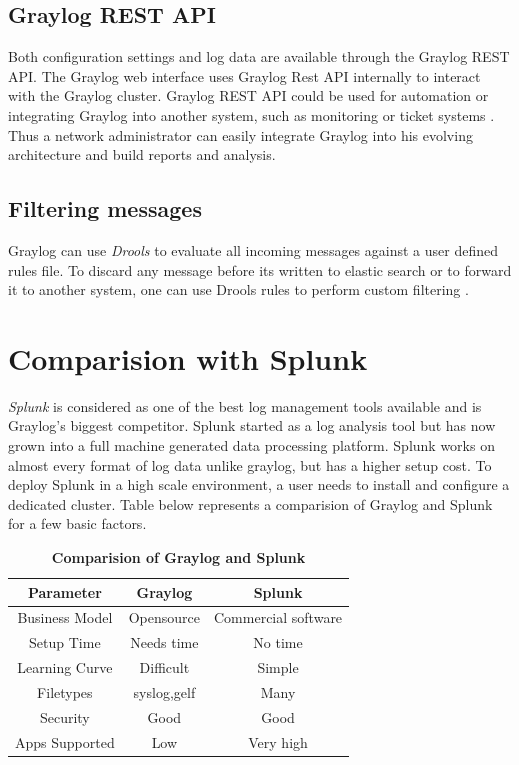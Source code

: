 \documentclass[9pt,twocolumn,twoside]{../../styles/osajnl}
\begin{document}
\subsection{Graylog REST API}

Both configuration settings and log data are available through the
Graylog REST API.  The Graylog web interface uses Graylog Rest API
internally to interact with the Graylog cluster. Graylog REST API
could be used for automation or integrating Graylog into another
system, such as monitoring or ticket systems
\cite{www-graylog-restapi}. Thus a network administrator can easily
integrate Graylog into his evolving architecture and build reports and
analysis.

\subsection{Filtering messages}

Graylog can use \emph{Drools} \cite{www-drools-org} to evaluate all
incoming messages against a user defined rules file. To discard any
message before its written to elastic search or to forward it to
another system, one can use Drools rules to perform custom filtering
\cite{www-graylog-blacklisting}.

\section{Comparision with Splunk}
\emph{Splunk} \cite{www-splunk} is considered as one of the best log
management tools available and is Graylog's biggest competitor. Splunk
started as a log analysis tool but has now grown into a full machine
generated data processing platform. Splunk works on almost every
format of log data unlike graylog, but has a higher setup cost. To
deploy Splunk in a high scale environment, a user needs to install and
configure a dedicated cluster. Table below represents a comparision of
Graylog and Splunk for a few basic factors.

\begin{table}[htbp]
\centering
\caption{\bf Comparision of Graylog and Splunk}\cite{www-logmanagementtools-blog} \cite{www-graylogvssplunk-article}
\begin{tabular}{ccc}
\hline
Parameter & Graylog & Splunk \\
\hline
Business Model& Opensource & Commercial software \\
Setup Time & Needs time & No time\\
Learning Curve & Difficult & Simple\\
Filetypes & syslog,gelf & Many\\
Security & Good & Good\\
Apps Supported & Low & Very high\\
\hline
\end{tabular}
  \label{tab:shape-functions}
\end{table}
\end{document}

